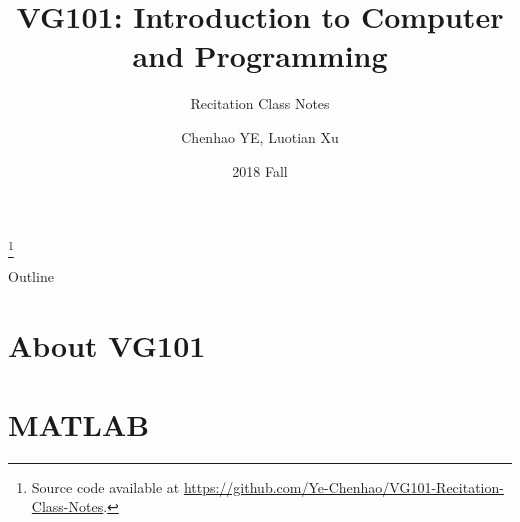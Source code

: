 \documentclass{beamer}
\title[VG101 Recitation Class Notes]{VG101: Introduction to Computer and Programming}
\author{Chenhao YE, Luotian Xu}
\date{2018 Fall}
\institute[UM-SJTU JI]{VG101 TA Group, UM-SJTU Joint Institute}
\subtitle{Recitation Class Notes}
\begin{document}
\begin{frame}
  \titlepage
  \renewcommand{\thefootnote}{}
  \footnote{Source code available at \url{https://github.com/Ye-Chenhao/VG101-Recitation-Class-Notes}.}\setcounter{footnote}{0}
\end{frame}

\begin{frame}{Outline}
  \tableofcontents
\end{frame}


\section{About VG101}


\section{MATLAB}
 
\end{document}

